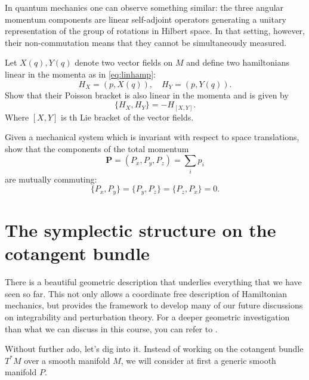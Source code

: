 \documentclass[english,fontsize=11pt,paper=a5,oneside]{scrbook}
\theoremstyle{definition}
\newenvironment{example}
  {\pushQED{\qed}\renewcommand{\qedsymbol}{$\lozenge$}\examplex}
  {\popQED\endexamplex}
\newenvironment{exercise}
  {\pushQED{\qed}\renewcommand{\qedsymbol}{$\maltese$}\exercisex}
  {\popQED\endexercisex}
\begin{document}
\begin{example}
    In quantum mechanics one can observe something similar: the three angular momentum components are linear self-adjoint operators generating a unitary representation of the group of rotations in Hilbert space.
    In that setting, however, their non-commutation means that they cannot be simultaneously measured.
\end{example}

\begin{exercise}
    Let $X(q), Y(q)$ denote two vector fields on $M$ and define two hamiltonians linear in the momenta as in \eqref{eq:linhamp}:
    \begin{equation}
        H_X = (p, X(q)),\quad H_Y = (p, Y(q)).
    \end{equation}
    Show that their Poisson bracket is also linear in the momenta and is given by
    \begin{equation}
        \big\{H_X, H_Y\big\} = - H_{[X,Y]}.
    \end{equation}
    Where $[X,Y]$ is th Lie bracket of the vector fields.
\end{exercise}

\begin{exercise}
    Given a mechanical system which is invariant with respect to space translations, show that the components of the total momentum
    \begin{equation}
        \bm P = (P_x, P_y, P_z) = \sum_i p_i
    \end{equation}
    are mutually commuting:
    \begin{equation}
        \big\{P_x, P_y\big\}
        =\big\{P_y, P_z\big\}
        =\big\{P_z, P_x\big\}
        =0.
    \end{equation}
\end{exercise}

\section{The symplectic structure on the cotangent bundle}

There is a beautiful geometric description that underlies everything that we have seen so far.
This not only allows a coordinate free description of Hamiltonian mechanics, but provides the framework to develop many of our future discussions on integrability and perturbation theory.
For a deeper geometric investigation than what we can discuss in this course, you can refer to \cite{book:dasilva}.

Without further ado, let's dig into it. Instead of working on the cotangent bundle $T^*M$ over a smooth manifold $M$, we will consider at first a generic smooth manifold $P$.
\end{document}
